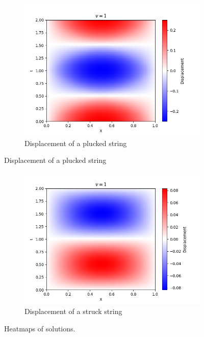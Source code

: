 \documentclass[10pt]{article}
\begin{document}
        \begin{figure}[h]\ContinuedFloat
        \centering
        \begin{subfigure}[b]{0.9\textwidth}
                \includegraphics[width=\textwidth]{./plucked_string.png}
                \caption{Displacement of a plucked string}
        \end{subfigure}
        \end{figure}
        \begin{figure}[h]\ContinuedFloat
        \centering
        \begin{subfigure}[b]{0.9\textwidth}
                \includegraphics[width=\textwidth]{./struck_string.png}
                \caption{Displacement of a struck string}
        \end{subfigure}
        \caption*{Heatmaps of solutions.}
        \label{fig:plots}
        \end{figure}
\end{document}
